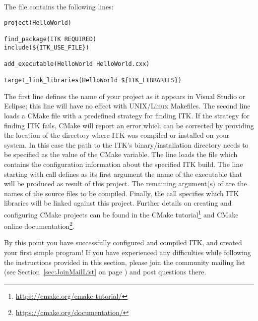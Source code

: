 The  file contains the following lines:

\begin{verbatim}
project(HelloWorld)

find_package(ITK REQUIRED)
include(${ITK_USE_FILE})

add_executable(HelloWorld HelloWorld.cxx)

target_link_libraries(HelloWorld ${ITK_LIBRARIES})
\end{verbatim}

The first line defines the name of your project as it appears in Visual Studio
or Eclipse; this line will have no effect with UNIX/Linux Makefiles. The second
line loads a CMake file with a predefined strategy for finding ITK. If the
strategy for finding ITK fails, CMake will report an error which can be
corrected by providing the location of the directory where ITK was compiled or
installed on your system. In this case the path to the ITK's binary/installation
directory needs to be specified as the value of the  CMake
variable. The line  loads the
 file which contains the configuration information about the
specified ITK build. The line starting with  call defines
as its first argument the name of the executable that will be produced
as result of this project. The remaining argument(s) of 
are the names of the source files to be compiled. Finally, the
 call specifies which ITK libraries will be
linked against this project. Further details on creating and configuring CMake
projects can be found in the CMake tutorial\footnote{
\url{https://cmake.org/cmake-tutorial/}} and CMake online
documentation\footnote{\url{https://cmake.org/documentation/}}.



By this point you have successfully configured and compiled ITK, and created
your first simple program! If you have experienced any difficulties while
following the instructions provided in this section, please join the community
mailing list (see Section~\ref{sec:JoinMailList} on
page \pageref{sec:JoinMailList}) and post questions there.
